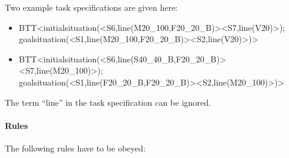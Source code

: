 Two example task specifications are given here:
\begin{itemize}
	\item BTT\textless initialsituation(\textless S6,line(M20\_100,F20\_20\_B)\textgreater \textless S7,line(V20)\textgreater); \\
	goalsituation(\textless S1,line(M20\_100,F20\_20\_B)\textgreater \textless S2,line(V20)\textgreater )\textgreater

	\item BTT\textless initialsituation(\textless S6,line(S40\_40\_B,F20\_20\_B)\textgreater \textless S7,line(M20\_100)\textgreater); \\
	goalsituation(\textless S1,line(F20\_20\_B,F20\_20\_B)>\textless S2,line(M20\_100)\textgreater )\textgreater

\end{itemize}

The term “line” in the task specification can be ignored.

%

\paragraph{Rules}
The following rules have to be obeyed:

